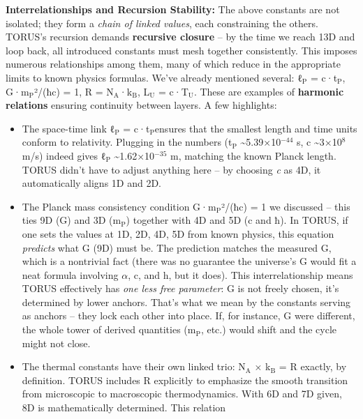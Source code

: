 \documentclass[]{article}
\newcommand{\subscript}[1]{\ensuremath{_{\mathrm{#1}}}}
\newcommand{\superscript}[1]{\ensuremath{^{\mathrm{#1}}}}
\begin{document}
\textbf{Interrelationships and Recursion Stability:} The above constants
are not isolated; they form a \emph{chain of linked values}, each
constraining the others. TORUS's recursion demands \textbf{recursive
closure} -- by the time we reach 13D and loop back, all introduced
constants must mesh together consistently. This imposes numerous
relationships among them, many of which reduce in the appropriate limits
to known physics formulas. We've already mentioned several:
ℓ\subscript{P} =
c·t\subscript{P}​,
G·m\subscript{P}²/(ħc) = 1,
R =
N\subscript{A}·k\subscript{B},
L\subscript{U} =
c·T\subscript{U}. These are
examples of \textbf{harmonic relations} ensuring continuity between
layers. A few highlights:

\begin{itemize}
\item
  The space-time link
  ℓ\subscript{P} =
  c·t\subscript{P}​ ensures
  that the smallest length and time units conform to relativity.
  Plugging in the numbers
  (t\subscript{P}
  \textasciitilde{}5.39×10\superscript{−44} s, c \textasciitilde{}3×10\superscript{8} m/s)
  indeed gives
  ℓ\subscript{P}
  \textasciitilde{}1.62×10\superscript{−35} m, matching the known Planck length.
  TORUS didn't have to adjust anything here -- by choosing \emph{c} as
  4D, it automatically aligns 1D and 2D.
\item
  The Planck mass consistency condition
  G·m\subscript{P}²/(ħc) =
  1​ we discussed -- this ties 9D (G) and 3D
  (m\subscript{P}) together
  with 4D and 5D (c and ħ). In TORUS, if one sets the values at 1D, 2D,
  4D, 5D from known physics, this equation \emph{predicts} what G (9D)
  must be. The prediction matches the measured G, which is a nontrivial
  fact (there was no guarantee the universe's G would fit a neat formula
  involving $\alpha$, c, and h, but it does). This interrelationship means
  TORUS effectively has \emph{one less free parameter}: G is not freely
  chosen, it's determined by lower anchors​. That's what we mean by the
  constants serving as anchors -- they lock each other into place. If,
  for instance, G were different, the whole tower of derived quantities
  (m\subscript{P}, etc.)
  would shift and the cycle might not close.
\item
  The thermal constants have their own linked trio:
  N\subscript{A} ×
  k\subscript{B} = R
  exactly, by definition. TORUS includes R explicitly to emphasize the
  smooth transition from microscopic to macroscopic thermodynamics​.
  With 6D and 7D given, 8D is mathematically determined. This relation

\end{itemize}
\end{document}
